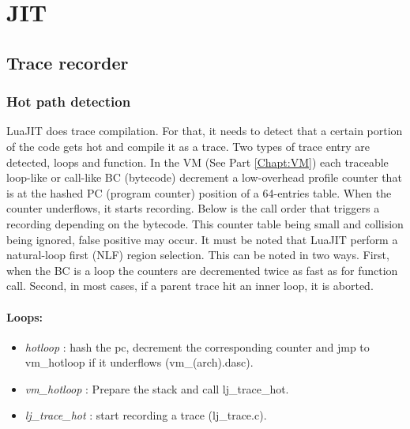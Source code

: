 \chapter{JIT}
\label{Chapt:JIT}


\section{Trace recorder}
\label{Sec:TR}


\subsection{Hot path detection}
\label{Subsec:hot-path}

LuaJIT does trace compilation. For that, it needs to detect that a certain
portion of the code gets hot and compile it as a trace. Two types of trace entry
are detected, loops and function. In the VM (See Part \ref{Chapt:VM}) each
traceable loop-like or call-like BC (bytecode) decrement a low-overhead profile
counter that is at the hashed PC (program counter) position of a 64-entries table.
When the counter underflows, it starts recording. Below is the call order that
triggers a recording depending on the bytecode. This counter table being small
and collision being ignored, false positive may occur.
It must be noted that LuaJIT perform a natural-loop first (NLF) region selection.
This can be noted in two ways. First, when the BC is a loop the counters are
decremented twice as fast as for function call. Second, in most cases, if a
parent trace hit an inner loop, it is aborted.

\subsubsection{Loops:}

\begin{itemize}
	\item \emph{hotloop} : hash the pc, decrement the corresponding counter and
jmp to vm\_hotloop if it underflows (vm\_(arch).dasc).
	\item \emph{vm\_hotloop} : Prepare the stack and call lj\_trace\_hot.
	\item \emph{lj\_trace\_hot} : start recording a trace (lj\_trace.c).
\end{itemize}

